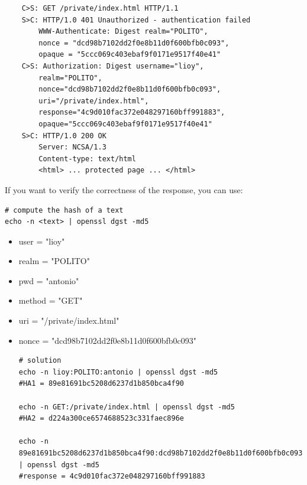 \begin{verbatim}
    C>S: GET /private/index.html HTTP/1.1
    S>C: HTTP/1.0 401 Unauthorized - authentication failed
        WWW-Authenticate: Digest realm="POLITO",
        nonce = "dcd98b7102dd2f0e8b11d0f600bfb0c093",
        opaque = "5ccc069c403ebaf9f0171e9517f40e41"
    C>S: Authorization: Digest username="lioy",
        realm="POLITO", 
        nonce="dcd98b7102dd2f0e8b11d0f600bfb0c093",
        uri="/private/index.html", 
        response="4c9d010fac372e048297160bff991883",
        opaque="5ccc069c403ebaf9f0171e9517f40e41"
    S>C: HTTP/1.0 200 OK
        Server: NCSA/1.3
        Content-type: text/html
        <html> ... protected page ... </html>
\end{verbatim}
\begin{tcolorbox}[colback=blue!10!white, colframe=blue!50!white, title=Exercise]
If you want to verify the correctness of the response, you can use:
\begin{lstlisting}[style=bashStyle]
# compute the hash of a text
echo -n <text> | openssl dgst -md5
\end{lstlisting}
    \begin{itemize}
        \item user = "lioy"
        \item realm = "POLITO"
        \item pwd = "antonio"
        \item method = "GET"
        \item uri = "/private/index.html"
        \item nonce = "dcd98b7102dd2f0e8b11d0f600bfb0c093"
        \begin{lstlisting}[style=bashStyle]
# solution
echo -n lioy:POLITO:antonio | openssl dgst -md5
#HA1 = 89e81691bc5208d6237d1b850bca4f90

echo -n GET:/private/index.html | openssl dgst -md5
#HA2 = d224a300ce6574688523c331faec896e

echo -n 89e81691bc5208d6237d1b850bca4f90:dcd98b7102dd2f0e8b11d0f600bfb0c093:d224a300ce6574688523c331faec896e | openssl dgst -md5
#response = 4c9d010fac372e048297160bff991883

        \end{lstlisting}
    \end{itemize}
\end{tcolorbox}


